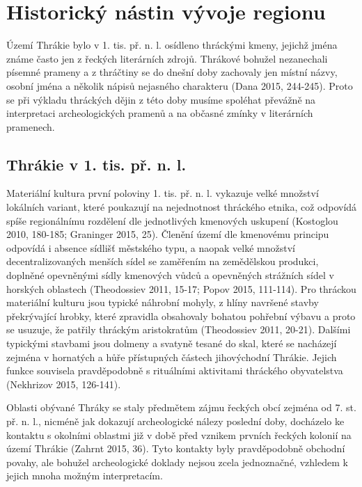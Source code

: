 \section[historický-nástin-vývoje-regionu]{Historický nástin vývoje regionu}

Území Thrákie bylo v 1. tis. př. n. l. osídleno thráckými kmeny, jejichž jména známe často jen z řeckých literárních zdrojů. Thrákové bohužel nezanechali písemné prameny a z thráčtiny se do dnešní doby zachovaly jen místní názvy, osobní jména a několik nápisů nejasného charakteru (Dana 2015, 244-245). Proto se při výkladu thráckých dějin z této doby musíme spoléhat převážně na interpretaci archeologických pramenů a na občasné zmínky v literárních pramenech.

\subsection[thrákie-v-1.-tis.-př.-n.-l.]{Thrákie v 1. tis. př. n. l.}

Materiální kultura první poloviny 1. tis. př. n. l. vykazuje velké množství lokálních variant, které poukazují na nejednotnost thráckého etnika, což odpovídá spíše regionálnímu rozdělení dle jednotlivých kmenových uskupení (Kostoglou 2010, 180-185; Graninger 2015, 25). Členění území dle kmenovému principu odpovídá i absence sídlišť městského typu, a naopak velké množství decentralizovaných menších sídel se zaměřením na zemědělskou produkci, doplněné opevněnými sídly kmenových vůdců a opevněných strážních sídel v horských oblastech (Theodossiev 2011, 15-17; Popov 2015, 111-114). Pro thráckou materiální kulturu jsou typické náhrobní mohyly, z hlíny navršené stavby překrývající hrobky, které zpravidla obsahovaly bohatou pohřební výbavu a proto se usuzuje, že patřily thráckým aristokratům (Theodossiev 2011, 20-21). Dalšími typickými stavbami jsou dolmeny a svatyně tesané do skal, které se nacházejí zejména v hornatých a hůře přístupných částech jihovýchodní Thrákie. Jejich funkce souvisela pravděpodobně s rituálními aktivitami thráckého obyvatelstva (Nekhrizov 2015, 126-141).

Oblasti obývané Thráky se staly předmětem zájmu řeckých obcí zejména od 7. st. př. n. l., nicméně jak dokazují archeologické nálezy poslední doby, docházelo ke kontaktu s okolními oblastmi již v době před vznikem prvních řeckých kolonií na území Thrákie (Zahrnt 2015, 36). Tyto kontakty byly pravděpodobně obchodní povahy, ale bohužel archeologické doklady nejsou zcela jednoznačné, vzhledem k jejich mnoha možným interpretacím.

